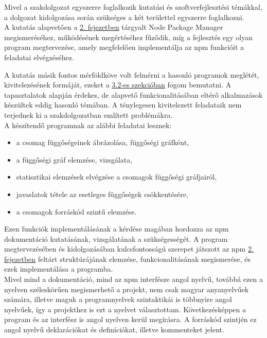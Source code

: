 

Mivel a szakdolgozat egyszerre foglalkozik kutatási és szoftverfejlesztési témákkal, a dolgozat kidolgozása során szükséges a két területtel egyszerre foglalkozni.\\

A kutatás alapvetően a \hyperlink{chapter.2}{2. fejezetben} tárgyalt Node Package Manager megismeréséhez, működésének megértéséhez fűződik, míg a fejlesztés egy olyan program megtervezése, amely megfelelően implementálja az npm funkcióit a feladatai elvégzéséhez.

A kutatás másik fontos mérföldköve volt felmérni a hasonló programok meglétét, kivitelezésének formáját, ezeket a \hyperlink{section.3.2}{3.2-es szekcióban} fogom bemutatni. A tapasztalatok alapján érdekes, de alapvető funkcionalitásában eltérő alkalmazások készültek eddig hasonló témában. A ténylegesen kivitelezett feladataik nem terjednek ki a szakdolgozatban említett problémákra.\\

A készítendő programnak az alábbi feladatai lesznek:
\begin{itemize}
	\item a csomag függőségeinek ábrázolása, függőségi gráfként,
	\item a függőségi gráf elemzése, vizsgálata,
	\item statisztikai elemzések elvégzése a csomagok függőségi gráfjairól,
	\item javaslatok tétele az esetleges függőségek csökkentésére,
	\item a csomagok forráskód szintű elemzése.
\end{itemize}

Ezen funkciók implementálásának a kérdése magában hordozza az npm dokumentáció kutatásának, vizsgálatának a szükségességét.
A program megtervezésében és kidolgozásában kulcsfontosságú szerepet játszott az npm \hyperlink{chapter.2}{2. fejezetben} feltárt struktúrájának elemzése, funkcionalitásának megismerése, és ezek implementálása a programba.\\

Mivel mind a dokumentáció, mind az npm interfésze angol nyelvű, továbbá ezen a nyelven széleskörűen megismerhető a projekt, nem csak magyar anyanyelvűek számára, illetve maguk a programnyelvek szintaktikái is többnyire angol nyelvűek, így a projekthez is ezt a nyelvet választottam. Következésképpen a program és az interfész is angol nyelven kerül megírásra. A forráskód szintjén ez angol nyelvű deklarációkat és definíciókat, illetve kommenteket jelent. 

